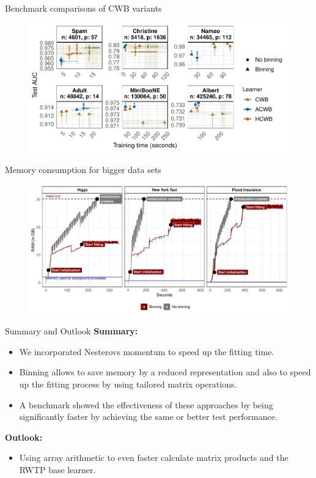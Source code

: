 \documentclass[t,10pt]{beamer}
\begin{document}
\begin{frame}{Benchmark comparisons of CWB variants}
  \begin{figure}
    \centering
    \includegraphics[width=\textwidth]{figures/fig-cacb-benchmark.pdf}
  \end{figure}
\end{frame}

\begin{frame}{Memory consumption for bigger data sets}
  \begin{figure}
    \centering
    \includegraphics[width=\textwidth]{figures/fig-cacb-big-data.pdf}
  \end{figure}
\end{frame}

\begin{frame}{Summary and Outlook}
  \textbf{Summary:}
  \begin{itemize}
    \item
      We incorporated Nesterovs momentum to speed up the fitting time.
    \item
      Binning allows to save memory by a reduced representation and also to speed up the fitting process by using tailored matrix operations.
    \item
      A benchmark showed the effectiveness of these approaches by being significantly faster by achieving the same or better test performance.
  \end{itemize}
  \textbf{Outlook:}
  \begin{itemize}
    \item
      Using array arithmetic to even faster calculate matrix products and the RWTP base learner.
  \end{itemize}
\end{frame}
\end{document}
